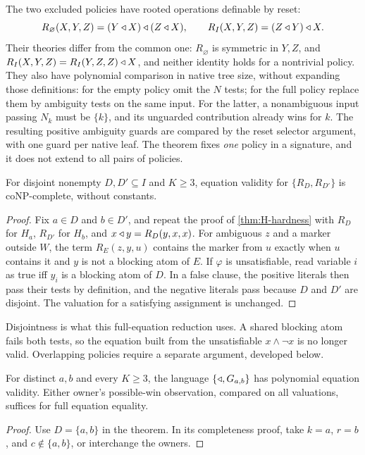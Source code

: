 The two excluded policies have rooted operations definable by reset:
\[
 R_\varnothing(X,Y,Z)=(Y\mathbin{\triangleleft} X)\mathbin{\triangleleft}(Z\mathbin{\triangleleft} X),\qquad
 R_I(X,Y,Z)=(Z\mathbin{\triangleleft} Y)\mathbin{\triangleleft} X.
\]
Their theories differ from the common one: $R_\varnothing$ is symmetric in $Y,Z$, and $R_I(X,Y,Z)=R_I(Y,Z,Z)\mathbin{\triangleleft} X$, and neither identity holds for a nontrivial policy.
They also have polynomial comparison in native tree size, without
expanding those definitions: for the empty policy omit the $N$ tests;
for the full policy replace them by ambiguity tests on the same input.
For the latter, a nonambiguous input passing $N_k$ must be $\{k\}$,
and its unguarded contribution already wins for $k$. The resulting
positive ambiguity guards are compared by the reset selector argument,
with one guard per native leaf. The theorem fixes \emph{one} policy in a signature, and it does not extend to all pairs of policies.

\begin{proposition}\label{selective:prop:disjoint}
For disjoint nonempty $D,D'\subseteq I$ and $K\geq3$, equation validity for
$\{R_D,R_{D'}\}$ is coNP-complete, without constants.
\end{proposition}
\begin{proof}
Fix $a\in D$ and $b\in D'$, and repeat the proof of \cref{thm:H-hardness} with
$R_D$ for $H_a$, $R_{D'}$ for $H_b$, and $x\mathbin{\triangleleft} y=R_D(y,x,x)$. For ambiguous $z$ and a marker
outside $W$, the term $R_E(z,y,u)$ contains the marker from $u$ exactly when $u$ contains it and
$y$ is not a blocking atom of $E$. If $\varphi$ is unsatisfiable, read variable $i$ as true iff
$y_i$ is a blocking atom of $D$. In a false clause, the positive literals then pass their tests
by definition, and the negative literals pass because $D$ and $D'$ are disjoint. The
valuation for a satisfying assignment is unchanged.
\end{proof}

Disjointness is what this full-equation reduction uses. A shared blocking atom fails both tests, so the
equation built from the unsatisfiable $x\land\lnot x$ is no longer valid.
Overlapping policies require a separate argument, developed below.

\begin{corollary}\label{selective:cor:G}
For distinct $a,b$ and every $K\geq3$, the language $\{\mathbin{\triangleleft},G_{a,b}\}$
has polynomial equation validity. Either owner's possible-win observation,
compared on all valuations, suffices for full equation equality.
\end{corollary}
\begin{proof}
Use $D=\{a,b\}$ in the theorem. In its completeness proof, take $k=a$, $r=b$, and $c\notin\{a,b\}$, or interchange the owners.
\end{proof}


